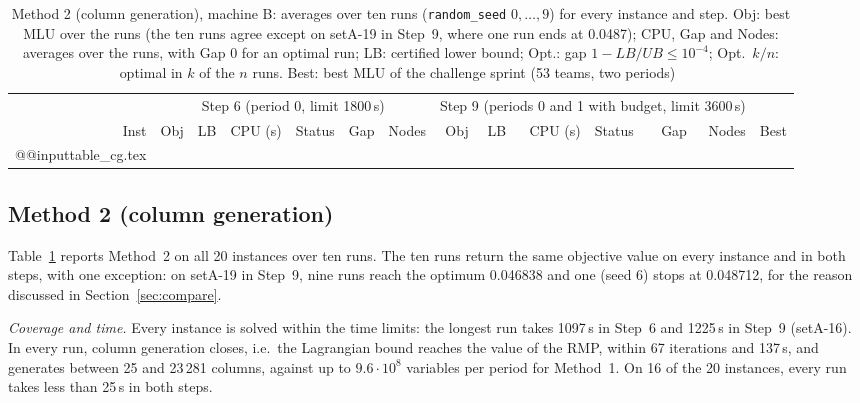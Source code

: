 \documentclass[conference]{IEEEtran}
\begin{document}
\begin{table}[t]
\centering\footnotesize
\caption{Method 2 (column generation), machine B: averages over ten runs (\texttt{random\_seed} $0,\dots,9$) for every instance and step. Obj: best MLU over the runs (the ten runs agree except on setA-19 in Step~9, where one run ends at 0.0487); CPU, Gap and Nodes: averages over the runs, with Gap 0 for an optimal run; LB: certified lower bound; Opt.: gap $1-LB/UB\le10^{-4}$; Opt.~$k/n$: optimal in $k$ of the $n$ runs. Best: best MLU of the challenge sprint (53 teams, two periods)~\cite{roadefrepo}}\label{tab:cg}
\setlength{\tabcolsep}{3.6pt}
\begin{tabular}{@{}r|rrrlrr|rrrlrr|r@{}}
\toprule
 & \multicolumn{6}{c|}{Step 6 (period 0, limit 1800\,s)} & \multicolumn{6}{c|}{Step 9 (periods 0 and 1 with budget, limit 3600\,s)} & \\
Inst & Obj & LB & CPU (s) & Status & Gap & Nodes & Obj & LB & CPU (s) & Status & Gap & Nodes & Best\\
\midrule
\csname @@input\endcsname table_cg.tex %
\bottomrule
\end{tabular}
\end{table}

\subsection{Method 2 (column generation)}\label{sec:cgres}
Table~\ref{tab:cg} reports Method~2 on all 20 instances over ten runs. The ten runs return the same objective value on every instance and in both steps, with one exception: on setA-19 in Step~9, nine runs reach the optimum 0.046838 and one (seed 6) stops at 0.048712, for the reason discussed in Section~\ref{sec:compare}.

\emph{Coverage and time.} Every instance is solved within the time limits: the longest run takes 1097\,s in Step~6 and 1225\,s in Step~9 (setA-16). In every run, column generation closes, i.e.\ the Lagrangian bound reaches the value of the RMP, within 67 iterations and 137\,s, and generates between 25 and 23\,281 columns, against up to $9.6\cdot10^8$ variables per period for Method~1. On 16 of the 20 instances, every run takes less than 25\,s in both steps.
\end{document}
